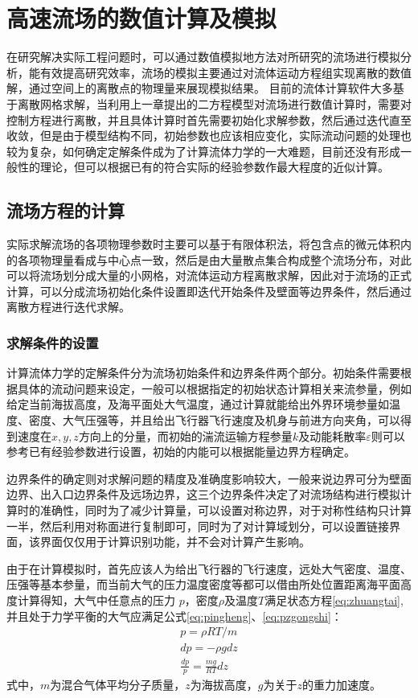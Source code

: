 \chapter{高速流场的数值计算及模拟}
在研究解决实际工程问题时，可以通过数值模拟地方法对所研究的流场进行模拟分析，能有效提高研究效率，流场的模拟主要通过对流体运动方程组实现离散的数值解，通过空间上的离散点的物理量来展现模拟结果。
目前的流体计算软件大多基于离散网格求解，当利用上一章提出的二方程模型对流场进行数值计算时，需要对控制方程进行离散，并且具体计算时首先需要初始化求解参数，然后通过迭代直至收敛，但是由于模型结构不同，初始参数也应该相应变化，实际流动问题的处理也较为复杂，如何确定定解条件成为了计算流体力学的一大难题，目前还没有形成一般性的理论\cite{yan2006}，但可以根据已有的符合实际的经验参数作最大程度的近似计算。
\section{流场方程的计算}
实际求解流场的各项物理参数时主要可以基于有限体积法，将包含点的微元体积内的各项物理量看成与中心点一致，然后是由大量散点集合构成整个流场分布，对此可以将流场划分成大量的小网格，对流体运动方程离散求解，因此对于流场的正式计算，可以分成流场初始化条件设置即迭代开始条件及壁面等边界条件，然后通过离散方程进行迭代求解。
\subsection{求解条件的设置}
计算流体力学的定解条件分为流场初始条件和边界条件两个部分。初始条件需要根据具体的流动问题来设定，一般可以根据指定的初始状态计算相关来流参量，例如给定当前海拔高度，及海平面处大气温度，通过计算就能给出外界环境参量如温度、密度、大气压强等，并且给出飞行器飞行速度及机身与前进方向夹角，可以得到速度在$x,y,z$方向上的分量，而初始的湍流运输方程参量$k$及动能耗散率$\varepsilon$则可以参考已有经验参数进行设置，初始的内能可以根据能量边界方程确定。

边界条件的确定则对求解问题的精度及准确度影响较大，一般来说边界可分为壁面边界、出入口边界条件及远场边界，这三个边界条件决定了对流场结构进行模拟计算时的准确性，同时为了减少计算量，可以设置对称边界，对于对称性结构只计算一半，然后利用对称面进行复制即可，同时为了对计算域划分，可以设置链接界面，该界面仅仅用于计算识别功能，并不会对计算产生影响。

由于在计算模拟时，首先应该人为给出飞行器的飞行速度，远处大气密度、温度、压强等基本参量，而当前大气的压力温度密度等都可以借由所处位置距离海平面高度计算得知，大气中任意点的压力 $p$，密度$\rho$及温度$T$满足状态方程\eqref{eq:zhuangtai},并且处于力学平衡的大气应满足公式\eqref{eq:pingheng}、\eqref{eq:pzgongshi}：
\begin{align}
p=\rho RT/m\label{eq:zhuangtai}\\
dp=-\rho gdz\label{eq:pingheng}\\
\frac{dp}{p}=\frac{mg}{RT}dz\label{eq:pzgongshi}
\end{align}
式中，$m$为混合气体平均分子质量，$z$为海拔高度，$g$为关于$z$的重力加速度。

